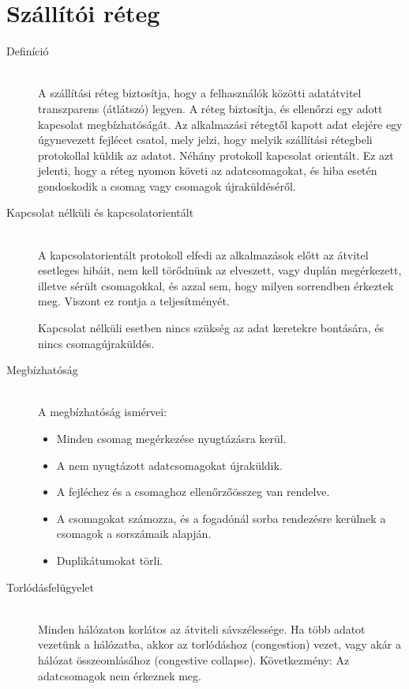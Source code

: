 \documentclass[margin=0px]{article}
\begin{document}
	\section{Szállítói réteg}
		\begin{description}
			\item[Definíció] \hfill \\
			A szállítási réteg biztosítja, hogy a felhasználók közötti adatátvitel transzparens (átlátszó) legyen. A réteg biztosítja, és ellenőrzi egy adott kapcsolat megbízhatóságát. Az alkalmazási rétegtől kapott adat elejére egy úgynevezett fejlécet csatol, mely jelzi, hogy melyik szállítási rétegbeli protokollal küldik az adatot. Néhány protokoll kapcsolat orientált. Ez azt jelenti, hogy a réteg nyomon követi az adatcsomagokat, és hiba esetén gondoskodik a csomag vagy csomagok újraküldéséről. 
			
			\item[Kapcsolat nélküli és kapcsolatorientált] \hfill \\
				 A kapcsolatorientált protokoll elfedi az alkalmazások előtt az átvitel esetleges hibáit, nem kell törődnünk az elveszett, vagy duplán megérkezett, illetve sérült csomagokkal, és azzal sem, hogy milyen sorrendben érkeztek meg. Viszont ez rontja a teljesítményét.
				 
				 Kapcsolat nélküli esetben nincs szükség az adat keretekre bontására, és nincs  csomagújraküldés.
			\item[Megbízhatóság] \hfill \\
				A megbízhatóság ismérvei:
				\begin{itemize}
					\item Minden csomag megérkezése nyugtázásra kerül.
					\item A nem nyugtázott adatcsomagokat újraküldik.
					\item A fejléchez és a csomaghoz ellenőrzőösszeg van rendelve.
					\item A csomagokat számozza, és a fogadónál sorba rendezésre kerülnek a csomagok a sorszámaik alapján.
					\item Duplikátumokat törli.
				\end{itemize}
			\item[Torlódásfelügyelet] \hfill \\
				Minden hálózaton  korlátos az átviteli sávszélessége. Ha több adatot vezetünk a hálózatba, akkor az torlódáshoz (congestion) vezet, vagy akár a hálózat összeomlásához (congestive collapse). Következmény: Az adatcsomagok nem érkeznek meg.


\end{description}
\end{document}
